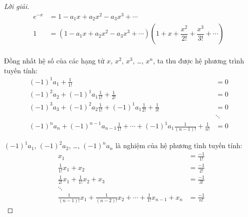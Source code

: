 \begin{proof}[Lời giải]
    \begingroup{}
    \allowdisplaybreaks{}
    \begin{align*}
        e^{-x} & = 1 - a_{1}x + a_{2}x^{2} - a_{3}x^{3} + \cdots                                                                      \\
        1      & = (1 - a_{1}x + a_{2}x^{2} - a_{3}x^{3} + \cdots)\left(1 + x + \dfrac{x^{2}}{2!} + \dfrac{x^{3}}{3!} + \cdots\right) \\
    \end{align*}
    \endgroup{}
    
    Đồng nhất hệ số của các hạng tử $x$, $x^{2}$, $x^{3}$, \ldots, $x^{n}$, ta thu được hệ phương trình tuyến tính:
    \begin{align*}
        {(-1)}^{1}a_{1} + \frac{1}{1!}                                                                              & = 0    \\
        {(-1)}^{2}a_{2} + {(-1)}^{1}a_{1}\frac{1}{1!} + \frac{1}{2!}                                                & = 0    \\
        {(-1)}^{3}a_{3} + {(-1)}^{2}a_{2}\frac{1}{1!} + {(-1)}^{1}a_{1}\frac{1}{2!} + \frac{1}{3!}                  & = 0    \\
                                                                                                                    & \ddots \\
        {(-1)}^{n}a_{n} + {(-1)}^{n-1}a_{n-1}\frac{1}{1!} + \cdots +{(-1)}^{1}a_{1}\frac{1}{(n-1)!} + \frac{1}{n!} & = 0
    \end{align*}
    
    ${(-1)}^{1}a_{1}$, ${(-1)}^{2}a_{2}$, \ldots, ${(-1)}^{n}a_{n}$ là nghiệm của hệ phương tình tuyến tính:
    \begin{align*}
         & x_{1}                                                                                & = \frac{-1}{1!} \\
         & \frac{1}{1!}x_{1} + x_{2}                                                            & = \frac{-1}{2!} \\
         & \frac{1}{2!}x_{1} + \frac{1}{1!}x_{2} + x_{3}                                        & = \frac{-1}{3!} \\
         & \ddots                                                                               &                 \\
         & \frac{1}{(n-1)!}x_{1} + \frac{1}{(n-2)!}x_{2} + \cdots + \frac{1}{1!}x_{n-1} + x_{n} & = \frac{-1}{n!}
    \end{align*}
    

\end{proof}

